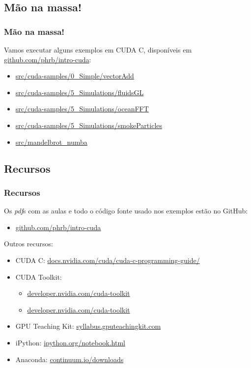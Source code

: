 \documentclass[10pt, compress]{beamer}
\begin{document}
\subsection{Mão na massa!}

\begin{frame}
    \frametitle{Mão na massa!}
    Vamos executar alguns exemplos em CUDA C,
    disponíveis em \url{github.com/phrb/intro-cuda}:
    \begin{itemize}
        \item \url{src/cuda-samples/0_Simple/vectorAdd}
            \pause
        \item \url{src/cuda-samples/5_Simulations/fluidsGL}
        \item \url{src/cuda-samples/5_Simulations/oceanFFT}
        \item \url{src/cuda-samples/5_Simulations/smokeParticles}
            \pause
        \item \url{src/mandelbrot_numba}
    \end{itemize}
\end{frame}

\subsection{Recursos}

\begin{frame}
    \frametitle{Recursos}

    Os \emph{pdf}s com as aulas e todo o código fonte usado nos exemplos estão
    no \alert{GitHub}:

    \begin{itemize}
        \item \url{github.com/phrb/intro-cuda}
    \end{itemize}

    Outros recursos:

    \begin{itemize}
        \item CUDA C: \url{docs.nvidia.com/cuda/cuda-c-programming-guide/}
        \item CUDA Toolkit:
            \begin{itemize}
                \item \url{developer.nvidia.com/cuda-toolkit}
                \item \url{developer.nvidia.com/cuda-toolkit}
            \end{itemize}
        \item GPU Teaching Kit: \url{syllabus.gputeachingkit.com}
        \item iPython: \url{ipython.org/notebook.html}
        \item Anaconda: \url{continuum.io/downloads}
    \end{itemize}
\end{frame}

\maketitle
\end{document}
